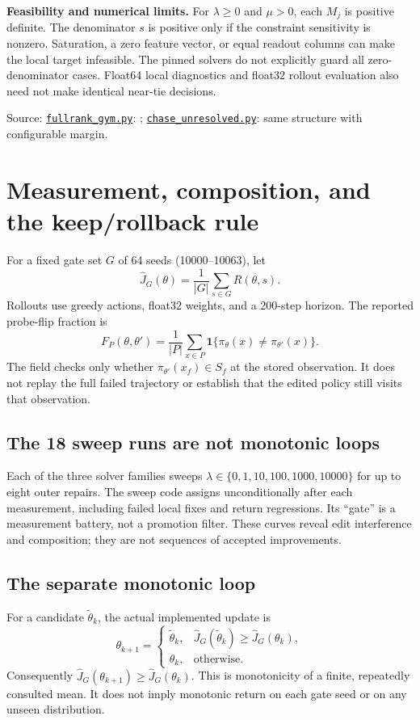 \documentclass[11pt]{article}
\newcommand{\code}[1]{\texttt{\detokenize{#1}}}
\newcommand{\source}[2]{\href{https://github.com/HarleyCoops/KimiBrainSurgery/blob/13cfaec9f484a1a8864349a814bfd62905022a05/#1}{\nolinkurl{#1}}: #2}
\begin{document}
\textbf{Feasibility and numerical limits.} For $\lambda\ge0$ and $\mu>0$, each
$M_j$ is positive definite. The denominator $s$ is positive only if the
constraint sensitivity is nonzero. Saturation, a zero feature vector, or equal
readout columns can make the local target infeasible. The pinned solvers do not
explicitly guard all zero-denominator cases. Float64 local diagnostics and
float32 rollout evaluation also need not make identical near-tie decisions.

\small Source: \source{fullrank_gym.py}{\code{solve_fullrank}};
\source{chase_unresolved.py}{same structure with configurable margin}.

\clearpage
\normalsize
\section{Measurement, composition, and the keep/rollback rule}
For a fixed gate set $G$ of 64 seeds (10000--10063), let
\begin{equation}
 \widehat J_G(\theta)=\frac1{|G|}\sum_{s\in G}R(\theta,s).
\end{equation}
Rollouts use greedy actions, float32 weights, and a 200-step horizon.
The reported probe-flip fraction is
\begin{equation}
 F_P(\theta,\theta')=\frac1{|P|}\sum_{x\in P}
 \mathbf1\{\pi_\theta(x)\ne\pi_{\theta'}(x)\}.
\end{equation}
The \code{fixed} field checks only whether $\pi_{\theta'}(x_f)\in S_f$ at the
stored observation. It does not replay the full failed trajectory or establish
that the edited policy still visits that observation.

\subsection*{The 18 sweep runs are not monotonic loops}
Each of the three solver families sweeps
$\lambda\in\{0,1,10,100,1000,10000\}$ for up to eight outer repairs.
The sweep code assigns \code{weights = new_weights} unconditionally after each
measurement, including failed local fixes and return regressions. Its ``gate''
is a measurement battery, not a promotion filter. These curves reveal edit
interference and composition; they are not sequences of accepted improvements.

\subsection*{The separate monotonic loop}
For a candidate $\widetilde\theta_k$, the actual implemented update is
\begin{equation}
 \theta_{k+1}=\begin{cases}
 \widetilde\theta_k,&\widehat J_G(\widetilde\theta_k)\ge\widehat J_G(\theta_k),\\
 \theta_k,&\text{otherwise}.
 \end{cases}
 \label{eq:gate}
\end{equation}
Consequently $\widehat J_G(\theta_{k+1})\ge\widehat J_G(\theta_k)$.
This is monotonicity of a finite, repeatedly consulted mean. It does not imply
monotonic return on each gate seed or on any unseen distribution.
\end{document}
